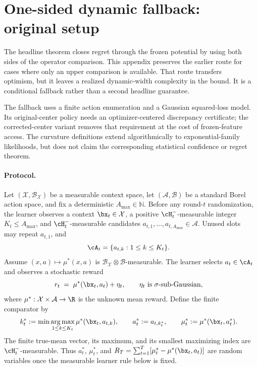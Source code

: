\section{One-sided dynamic fallback: original setup}
\label{app:one-sided-fallback}\label{sec:problem}
The headline theorem closes regret through the frozen potential by using both
sides of the operator comparison.  This appendix preserves the earlier route
for cases where only an upper comparison is available.  That route transfers
optimism, but it leaves a realized dynamic-width complexity in the bound.  It
is a conditional fallback rather than a second headline guarantee.

The fallback uses a finite action enumeration and a Gaussian squared-loss
model.  Its original-center policy needs an optimizer-centered discrepancy
certificate; the corrected-center variant removes that requirement at the cost
of frozen-feature access.  The curvature definitions extend algorithmically to
exponential-family likelihoods, but  does not claim the
corresponding statistical confidence or regret theorem.

\paragraph{Protocol.}
Let $(\mathcal X,\mathcal B_{\mathcal X})$ be a measurable context space, let
$(\mathcal A,\mathcal B)$ be a standard Borel action space, and fix a
deterministic $A_{\max}\in\mathbb N$.  Before any round-$t$ randomization,
the learner observes a context $\bx_t\in\mathcal X$, a positive
$\cH_t^-$-measurable integer $K_t\le A_{\max}$, and
$\cH_t^-$-measurable candidates
$a_{t,1},\ldots,a_{t,A_{\max}}\in\mathcal A$.  Unused slots may repeat
$a_{t,1}$, and
\[
 \cA_t=\{a_{t,k}:1\le k\le K_t\}.
\]
Assume $(x,a)\mapsto\mu^*(x,a)$ is
$\mathcal B_{\mathcal X}\otimes\mathcal B$-measurable.  The learner selects
$a_t\in\cA_t$ and observes a stochastic reward
\begin{equation}\label{eq:reward}
  r_t \;=\; \mu^*(\bx_t, a_t) + \eta_t, \qquad
  \eta_t \text{ is } \sigma\text{-sub-Gaussian},
\end{equation}
where $\mu^*:\mathcal{X}\times\mathcal{A}\to\R$ is the unknown mean reward.
Define the finite comparator by
\[
 k_t^*:=\min\operatorname*{arg\,max}_{1\le k\le K_t}
       \mu^*(\bx_t,a_{t,k}),\qquad
 a_t^*:=a_{t,k_t^*},\qquad
 \mu_t^*:=\mu^*(\bx_t,a_t^*).
\]
The finite true-mean vector, its maximum, and its smallest maximizing index are
$\cH_t^-$-measurable.  Thus $a_t^*$, $\mu_t^*$, and
$R_T=\sum_{t=1}^T[\mu_t^*-\mu^*(\bx_t,a_t)]$ are random variables once the
measurable learner rule below is fixed.

